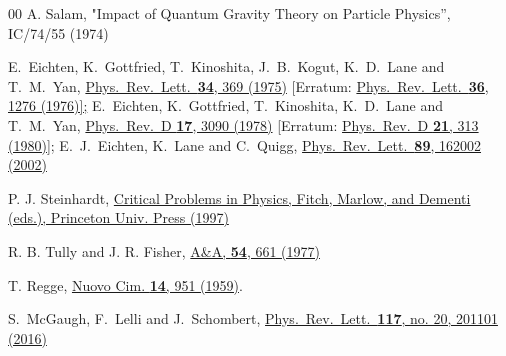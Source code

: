 \documentclass[superscriptaddress,amsmath,amssymb,nofootinbib]{revtex4}
\begin{document}
\begin{thebibliography}{00}
A. Salam,
"Impact of Quantum Gravity Theory on Particle Physics'',
IC/74/55 (1974)

  E.~Eichten, K.~Gottfried, T.~Kinoshita, J.~B.~Kogut, K.~D.~Lane and T.~M.~Yan,
\href{https://journals.aps.org/prl/abstract/10.1103/PhysRevLett.34.369}{Phys.\ Rev.\ Lett.\  {\bf 34}, 369 (1975)}
[Erratum: \href{https://journals.aps.org/prl/abstract/10.1103/PhysRevLett.36.1276}{Phys.\ Rev.\ Lett.\  {\bf 36}, 1276 (1976)];}
  E.~Eichten, K.~Gottfried, T.~Kinoshita, K.~D.~Lane and T.~M.~Yan,
\href{https://journals.aps.org/prd/abstract/10.1103/PhysRevD.17.3090}{Phys.\ Rev.\ D {\bf 17}, 3090 (1978)} [Erratum:
\href{https://journals.aps.org/prd/abstract/10.1103/PhysRevD.21.313.2}{Phys.\ Rev.\ D {\bf 21}, 313 (1980)];}
  E.~J.~Eichten, K.~Lane and C.~Quigg,
\href{https://journals.aps.org/prl/abstract/10.1103/PhysRevLett.89.162002}{Phys.\ Rev.\ Lett.\  {\bf 89}, 162002 (2002)}

P. J. Steinhardt,
\href{https://press.princeton.edu/books/paperback/9780691057842/critical-problems-in-physics}
{Critical Problems in Physics, Fitch, Marlow, and Dementi (eds.), Princeton Univ. Press (1997)}

R. B. Tully and J. R. Fisher, 
\href{http://adsabs.harvard.edu/abs/1977A&A....54..661T}{A\&A, \textbf{54}, 661 (1977)}

T. Regge, 
\href{https://link.springer.com/article/10.1007\%2FBF02728177}{Nuovo Cim. \textbf{14}, 951 (1959)}.




 S.~McGaugh, F.~Lelli and J.~Schombert,
 \href{https://journals.aps.org/prl/abstract/10.1103/PhysRevLett.117.201101}{Phys.\ Rev.\ Lett.\  {\bf 117}, no. 20, 201101 (2016)}


\end{thebibliography}
\end{document}
